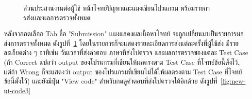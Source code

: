 \documentclass[12pt,one side,openright,a4paper]{cpe-thesis-th}
\newcommand{\thaijustify}[1]{%
  \par\hspace{30pt}\justifying
  #1
}
\begin{document}
\begin{figure}[H]
  \centering
  \caption[ส่วนประสานต่อผู้ใช้ หน้าแผงเขียนโปรแกรมและรายการส่งพร้อทผลการตรวจ]{ส่วนประสานงานต่อผู้ใช้ หน้าโจทย์ปัญหาและแผงเขียนโปรแกรม พร้อมรายการส่งเเละผลการตรวจทั้งหมด}
  \label{fig:new-ui-code2}
\end{figure}
\thaijustify{
  หลังจากกดเลือก Tab ชื่อ "Submission" เเผงแสดงผลเนื้อหาโจทย์ จะถูกเปลี่ยนมาเป็นรายการผลส่งการตรวจทั้งหมด ดังรูปที่~\ref{fig:new-ui-code2} โดยในรายการก็จะแสดงรายละเอียดการส่งแต่ละครั้งที่ผู้ใช้ส่ง มีรายละเอียดต่าง ๆ อาทิเช่น วันเวลาที่ส่งคำตอบ ภาษาที่ส่งไปตรวจ และผลการตรวจของแต่ละ Test Case (ถ้า Correct แปลว่า output ของโปรแกรมที่เขียนให้ผลตรงตาม Test Case ที่โจทย์ข้อนี้ตั้งไว้, แต่ถ้า Wrong ก็จะแสดงว่า output ของโปรแกรมที่เขียนไม่ได้ให้ผลตรงตาม Test Case ที่โจทย์ข้อนี้ตั้งไว้) และยังมีปุ่ม "View code" สำหรับกดดูคำตอบที่ส่งไปตรวจได้อีกด้วย ดังรูปที่~\ref{fig:new-ui-code3}
}
\end{document}
